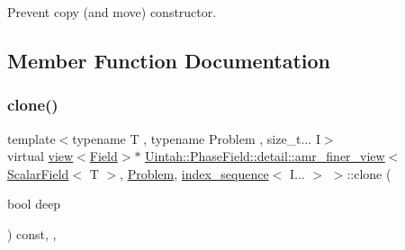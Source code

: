 Prevent copy (and move) constructor. 



\subsection{Member Function Documentation}
\mbox{\label{classUintah_1_1PhaseField_1_1detail_1_1amr__finer__view_3_01ScalarField_3_01T_01_4_00_01Problem_810ae3f886a4d3bdb2b37c629369a2ec_a38bba423ebb77e4aaaded71c0c80583e}} 
\subsubsection{\texorpdfstring{clone()}{clone()}\hspace{0.1cm}{\footnotesize\ttfamily [1/2]}}
{\footnotesize\ttfamily template$<$typename T , typename Problem , size\+\_\+t... I$>$ \\
virtual \hyperlink{classUintah_1_1PhaseField_1_1detail_1_1view}{view}$<$\hyperlink{structUintah_1_1PhaseField_1_1ScalarField}{Field}$>$$\ast$ \hyperlink{classUintah_1_1PhaseField_1_1detail_1_1amr__finer__view}{Uintah\+::\+Phase\+Field\+::detail\+::amr\+\_\+finer\+\_\+view}$<$ \hyperlink{structUintah_1_1PhaseField_1_1ScalarField}{Scalar\+Field}$<$ T $>$, \hyperlink{classUintah_1_1PhaseField_1_1Problem}{Problem}, \hyperlink{namespaceUintah_1_1PhaseField_a237de804d99512e50613aff7c94a9461}{index\+\_\+sequence}$<$ I... $>$ $>$\+::clone (\begin{DoxyParamCaption}\item[{bool}]{deep }\end{DoxyParamCaption}) const\hspace{0.3cm}{\ttfamily [inline]}, {\ttfamily [override]}, {\ttfamily [virtual]}}



